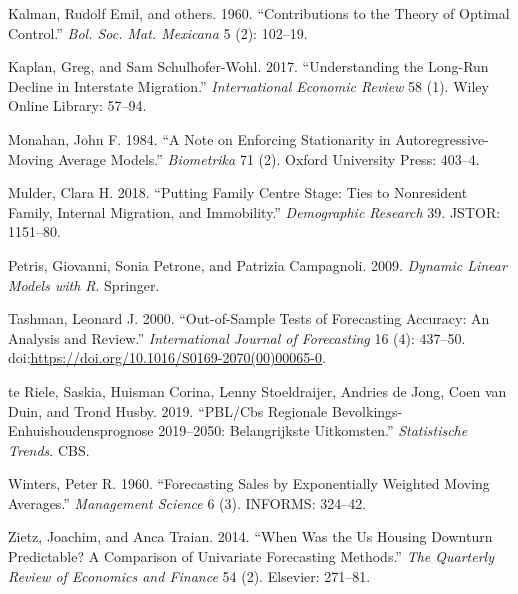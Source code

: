 \documentclass[]{article}
\begin{document}
\hypertarget{ref-kalman1960contributions}{}
Kalman, Rudolf Emil, and others. 1960. ``Contributions to the Theory of
Optimal Control.'' \emph{Bol. Soc. Mat. Mexicana} 5 (2): 102--19.

\hypertarget{ref-kaplan2017understanding}{}
Kaplan, Greg, and Sam Schulhofer-Wohl. 2017. ``Understanding the
Long-Run Decline in Interstate Migration.'' \emph{International Economic
Review} 58 (1). Wiley Online Library: 57--94.

\hypertarget{ref-monahan1984note}{}
Monahan, John F. 1984. ``A Note on Enforcing Stationarity in
Autoregressive-Moving Average Models.'' \emph{Biometrika} 71 (2). Oxford
University Press: 403--4.

\hypertarget{ref-mulder2018putting}{}
Mulder, Clara H. 2018. ``Putting Family Centre Stage: Ties to
Nonresident Family, Internal Migration, and Immobility.''
\emph{Demographic Research} 39. JSTOR: 1151--80.

\hypertarget{ref-petris2009dynamic}{}
Petris, Giovanni, Sonia Petrone, and Patrizia Campagnoli. 2009.
\emph{Dynamic Linear Models with R}. Springer.

\hypertarget{ref-tashman2000out}{}
Tashman, Leonard J. 2000. ``Out-of-Sample Tests of Forecasting Accuracy:
An Analysis and Review.'' \emph{International Journal of Forecasting} 16
(4): 437--50.
doi:\href{https://doi.org/https://doi.org/10.1016/S0169-2070(00)00065-0}{https://doi.org/10.1016/S0169-2070(00)00065-0}.

\hypertarget{ref-teriele2019}{}
te Riele, Saskia, Huisman Corina, Lenny Stoeldraijer, Andries de Jong,
Coen van Duin, and Trond Husby. 2019. ``PBL/Cbs Regionale Bevolkings-
Enhuishoudensprognose 2019--2050: Belangrijkste Uitkomsten.''
\emph{Statistische Trends}. CBS.

\hypertarget{ref-winters1960forecasting}{}
Winters, Peter R. 1960. ``Forecasting Sales by Exponentially Weighted
Moving Averages.'' \emph{Management Science} 6 (3). INFORMS: 324--42.

\hypertarget{ref-zietz2014us}{}
Zietz, Joachim, and Anca Traian. 2014. ``When Was the Us Housing
Downturn Predictable? A Comparison of Univariate Forecasting Methods.''
\emph{The Quarterly Review of Economics and Finance} 54 (2). Elsevier:
271--81.
\end{document}
